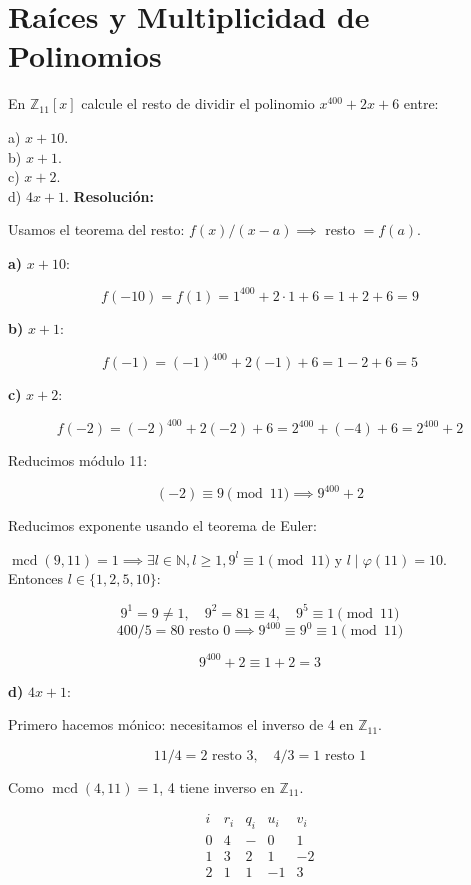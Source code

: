 \documentclass[a4paper,12pt]{article}
\begin{document}
\section{Raíces y Multiplicidad de Polinomios}

\begin{ejercicio}[title=Ejercicio 45]
En $\mathbb{Z}_{11}[x]$ calcule el resto de dividir el polinomio $x^{400} + 2x + 6$ entre:

a) $x + 10$.  \\
b) $x + 1$.  \\
c) $x + 2$.  \\
d) $4x + 1$.
\tcblower
\textbf{Resolución:}

Usamos el teorema del resto: $f(x)/(x-a) \implies$ resto $= f(a)$.

\textbf{a) } $x+10$:

\[
f(-10) = f(1) = 1^{400} + 2\cdot 1 + 6 = 1 + 2 + 6 = \boxed{9}
\]

\textbf{b) } $x+1$:

\[
f(-1) = (-1)^{400} + 2(-1) + 6 = 1 -2 + 6 = \boxed{5}
\]

\textbf{c) } $x+2$:

\[
f(-2) = (-2)^{400} + 2(-2) + 6 = 2^{400} + (-4) + 6 = 2^{400} + 2
\]

Reducimos módulo 11:  

\[
(-2) \equiv 9 \pmod{11} \implies 9^{400} + 2
\]

Reducimos exponente usando el teorema de Euler:

\vspace{0.5em}

\(\operatorname{mcd}(9,11) = 1 \implies \exists l \in \mathbb{N}, l \ge 1, 9^l \equiv 1 \pmod{11}\) y \(l \mid \varphi(11) = 10\). \\

Entonces \(l \in \{1,2,5,10\}\):

\[
9^1 = 9 \neq 1, \quad 9^2 = 81 \equiv 4, \quad 9^5 \equiv 1 \pmod{11}
\]
\[
400 / 5 = 80 \text{ resto } 0 \implies 9^{400} \equiv 9^0 \equiv 1 \pmod{11}
\]

\[
9^{400} + 2 \equiv 1 + 2 = \boxed{3}
\]

\textbf{d) } $4x+1$:

Primero hacemos mónico: necesitamos el inverso de 4 en $\mathbb{Z}_{11}$.

\[
11 / 4 = 2 \text{ resto } 3, \quad 4 / 3 = 1 \text{ resto } \boxed{1}
\]

Como $\operatorname{mcd}(4,11) = 1$, 4 tiene inverso en $\mathbb{Z}_{11}$.

\[
\begin{array}{c|c|c|c|c}
i & r_i & q_i & u_i & v_i \\
\hline
0 & 4 & - & 0 & 1 \\
1 & 3 & 2 & 1 & -2 \\
2 & \boxed{1} & 1 & -1 & 3
\end{array}
\]

\end{ejercicio}
\end{document}
